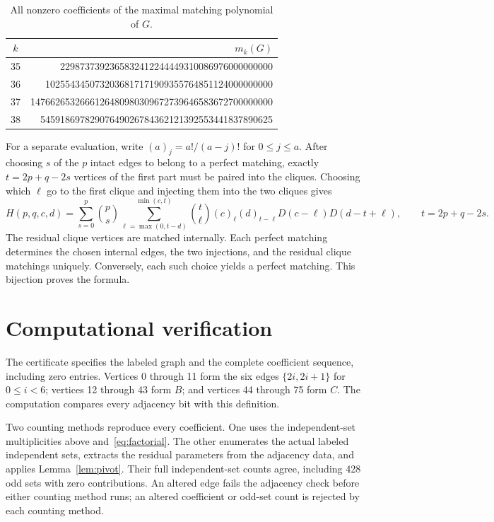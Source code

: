 \documentclass[11pt]{article}
\begin{document}
\begin{table}[ht]
\centering
\small
\begin{tabular}{cr}
\toprule
$k$&$m_k(G)$\\\midrule
35&2298737392365832412244449310086976000000000\\
36&1025543450732036817171909355764851124000000000\\
37&1476626532666126480980309672739646583672700000000\\
38&54591869782907649026784362121392553441837890625\\
\bottomrule
\end{tabular}
\caption{All nonzero coefficients of the maximal matching polynomial of $G$.}
\label{tab:counts}
\end{table}

For a separate evaluation, write $(a)_j=a!/(a-j)!$ for $0\leq j\leq a$.
After choosing $s$ of the $p$ intact edges to belong to a perfect
matching, exactly $t=2p+q-2s$ vertices of the first part must be paired
into the cliques. Choosing which $\ell$ go to the first clique and
injecting them into the two cliques gives
\begin{equation}\label{eq:factorial}
H(p,q,c,d)=\sum_{s=0}^{p}\binom ps
 \sum_{\ell=\max(0,t-d)}^{\min(c,t)}
 \binom t\ell(c)_\ell(d)_{t-\ell}D(c-\ell)D(d-t+\ell),
\qquad t=2p+q-2s.
\end{equation}
The residual clique vertices are matched internally. Each perfect
matching determines the chosen internal edges, the two injections,
and the residual clique matchings uniquely. Conversely, each such
choice yields a perfect matching. This bijection proves the formula.

\section{Computational verification}\label{sec:verification}
The certificate specifies the labeled graph and the complete
coefficient sequence, including zero entries. Vertices 0 through 11
form the six edges $\{2i,2i+1\}$ for $0\leq i<6$; vertices 12 through
43 form $B$; and vertices 44 through 75 form $C$.
The computation compares every adjacency bit with this definition.

Two counting methods reproduce every coefficient. One uses the
independent-set multiplicities above and~\eqref{eq:factorial}. The
other enumerates the actual labeled independent sets, extracts the
residual parameters from the adjacency data, and applies
Lemma~\ref{lem:pivot}. Their full independent-set counts agree,
including 428 odd sets with zero contributions. An altered edge fails
the adjacency check before either counting method runs; an altered
coefficient or odd-set count is rejected by each counting method.
\end{document}
